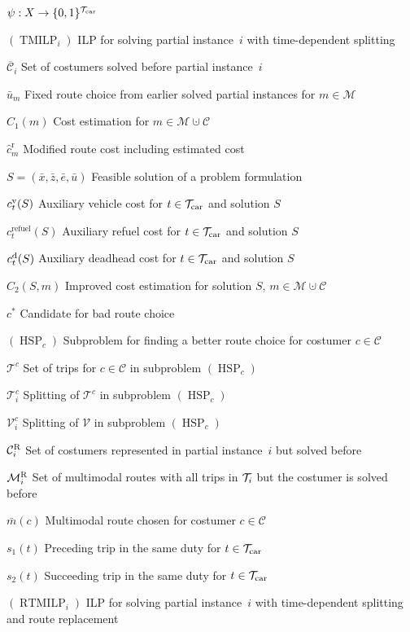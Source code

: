 \begin{labeling}{$\psi:X\to\{0,1\}^{\mathcal{T}_{\operatorname{car}}}$}
	\item[$(\operatorname{TMILP}_i)$]{ILP for solving partial instance~$i$ with time-dependent splitting}
	\item[$\overline{\mathcal{C}}_i$]{Set of costumers solved before partial instance~$i$}
	\item[$\bar{u}_m$]{Fixed route choice from earlier solved partial instances for $m\in\mathcal{M}$}
	\item[$C_1(m)$]{Cost estimation for $m\in\mathcal{M}\cupdot\mathcal{C}$}
	\item[$\hat{c}^{\operatorname{r}}_m$]{Modified route cost including estimated cost}
	\item[$S=\left(\bar{x},\bar{z},\bar{e},\bar{u}\right)$]{Feasible solution of a problem formulation}
	\item[$c^{\operatorname{v}}_t(S)$]{Auxiliary vehicle cost for $t\in\mathcal{T}_{\operatorname{car}}$ and solution $S$}
	\item[$c^{\operatorname{refuel}}_t(S)$]{Auxiliary refuel cost for $t\in\mathcal{T}_{\operatorname{car}}$ and solution $S$}
	\item[$c^{\operatorname{d}}_t(S)$]{Auxiliary deadhead cost for $t\in\mathcal{T}_{\operatorname{car}}$ and solution $S$}
	\item[$C_2(S,m)$]{Improved cost estimation for solution $S$, $m\in\mathcal{M}\cupdot\mathcal{C}$}
	\item[$c^*$]{Candidate for bad route choice}
	\item[$(\operatorname{HSP}_c)$]{Subproblem for finding a better route choice for costumer $c\in\mathcal{C}$}
	\item[$\mathcal{T}^c$]{Set of trips for $c\in\mathcal{C}$ in subproblem $(\operatorname{HSP}_c)$}
	\item[$\mathcal{T}^c_i$]{Splitting of $\mathcal{T}^c$ in subproblem $(\operatorname{HSP}_c)$}
	\item[$\mathcal{V}^c_i$]{Splitting of $\mathcal{V}$ in subproblem $(\operatorname{HSP}_c)$}
	\item[$\mathcal{C}^{\operatorname{R}}_i$]{Set of costumers represented in partial instance~$i$ but solved before}
	\item[$\mathcal{M}^{\operatorname{R}}_i$]{Set of multimodal routes with all trips in $\mathcal{T}_i$ but the costumer is solved before}
	\item[$\bar{m}(c)$]{Multimodal route chosen for costumer $c\in\mathcal{C}$}
	\item[$s_1(t)$]{Preceding trip in the same duty for $t\in\mathcal{T}_{\operatorname{car}}$}
	\item[$s_2(t)$]{Succeeding trip in the same duty for $t\in\mathcal{T}_{\operatorname{car}}$}
	\item[$(\operatorname{RTMILP}_i)$]{ILP for solving partial instance~$i$ with time-dependent splitting and route replacement}

\end{labeling}
